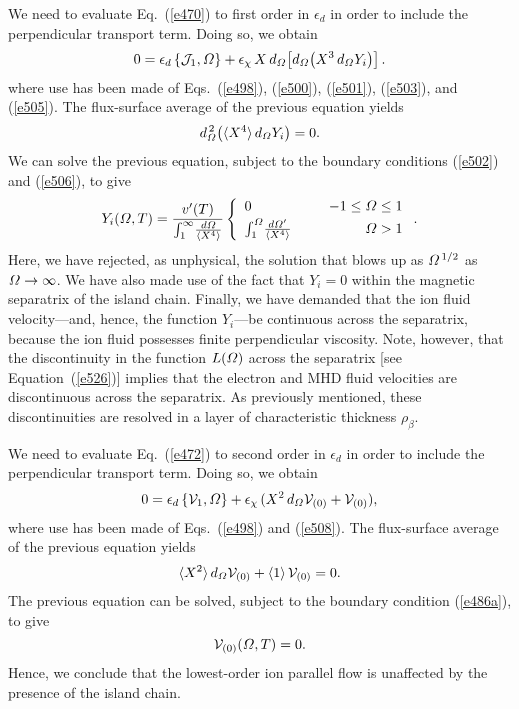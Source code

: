 \documentclass[12pt,prb,aps]{revtex4-1}
\begin{document}
We need to evaluate Eq.~(\ref{e470}) to first order in $\epsilon_d$ in order to include the perpendicular transport term. Doing so,
we obtain
\begin{equation}\label{e528a}
0 =\epsilon_d\,\{{\cal J}_1,{\mit\Omega}\} +\epsilon_\chi\,X\,d_{{\mit\Omega}}\!\left[d_{\mit\Omega}\!\left(X^3\,d_{\mit\Omega} Y_i\right)\right].
\end{equation}
where use has been made of Eqs.~(\ref{e498}), (\ref{e500}), (\ref{e501}), (\ref{e503}), and (\ref{e505}). The flux-surface average of the previous equation yields 
\begin{equation}
d_{\mit\Omega}^{\,2}\!\left(\langle X^4\rangle\,d_{\mit\Omega} Y_i\right)= 0.
\end{equation}
We can solve the previous equation, subject to the boundary conditions (\ref{e502}) and (\ref{e506}), to give\,\cite{fw}
\begin{equation}\label{e530}
Y_i({\mit\Omega},T)=\frac{v'(T)}{\int_1^\infty \!\frac{d{\mit\Omega}}{\langle X^4\rangle}}\left\{
\begin{array}{llr}
0&&-1\leq {\mit\Omega}\leq 1\\[0.5ex]
\int_1^{\mit\Omega}\! \frac{d{\mit\Omega}'}{\langle X^4\rangle}&~~&{\mit\Omega}>1
\end{array}\right..
\end{equation}
Here, we have rejected, as unphysical, the solution that blows up as ${\mit\Omega}^{\,1/2}$ as ${\mit\Omega}\rightarrow\infty$. 
We have also made use of the fact that $Y_i=0$ within the magnetic separatrix of the island chain. Finally, we have  demanded that the ion
fluid velocity---and, hence, the function $Y_i$---be continuous across the separatrix, because the ion fluid possesses finite perpendicular viscosity. 
Note, however, that the discontinuity in the function $L({\mit\Omega})$ across the separatrix [see Equation~(\ref{e526})] implies that the
electron and MHD  fluid velocities are  discontinuous across the separatrix.  As previously
mentioned, these discontinuities are resolved in a layer of characteristic thickness $\rho_\beta$. 

We need to evaluate Eq.~(\ref{e472}) to second order in $\epsilon_d$ in order to include the perpendicular transport term. Doing so,
we obtain
\begin{equation}
0=\epsilon_d\,\{{\cal V}_1,{\mit\Omega}\} + \epsilon_\chi\,(X^2\,d_{\mit\Omega} {\cal V}_{(0)} + {\cal V}_{(0)}),
\end{equation}
where use has been made of Eqs.~(\ref{e498}) and (\ref{e508}). The flux-surface average of the
previous equation yields
\begin{equation}
\langle X^2\rangle\,d_{\mit\Omega} {\cal V}_{(0)} +\langle 1\rangle \,{\cal V}_{(0)}= 0.
\end{equation}
 The previous equation can be solved, subject to the boundary condition (\ref{e486a}), to
give
\begin{equation}
{\cal V}_{(0)}({\mit\Omega}, T) = 0.
\end{equation}
Hence, we conclude that the lowest-order ion parallel flow is unaffected by the presence of the island chain. 
\end{document}
